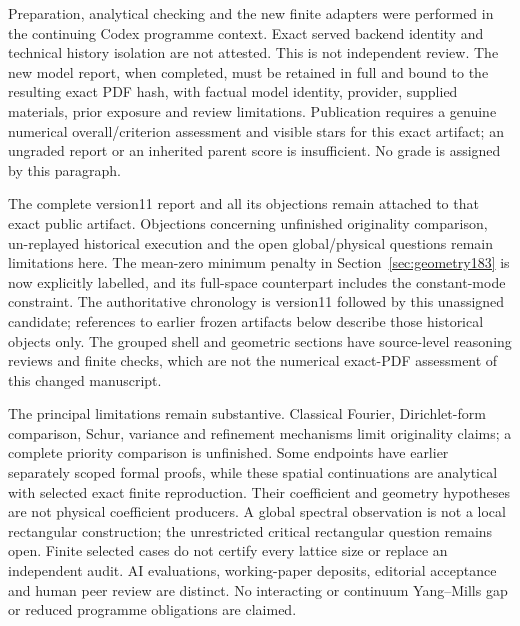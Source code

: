 \documentclass[11pt]{article}
\begin{document}
Preparation, analytical checking and the new finite adapters were performed
in the continuing Codex programme context. Exact served backend identity
and technical history isolation are not attested. This is not independent
review. The new model report, when completed, must be retained in full and
bound to the resulting exact PDF hash, with factual model identity,
provider, supplied materials, prior exposure and review limitations.
Publication requires a genuine numerical overall/criterion assessment and
visible stars for this exact artifact; an ungraded report or an inherited
parent score is insufficient. No grade is assigned by this paragraph.

The complete version11 report and all its objections remain attached to
that exact public artifact. Objections concerning unfinished originality
comparison, un-replayed historical execution and the open global/physical
questions remain limitations here. The mean-zero minimum penalty in
Section~\ref{sec:geometry183} is now explicitly labelled, and its full-space
counterpart includes the constant-mode constraint. The authoritative
chronology is version11 followed by this unassigned candidate; references
to earlier frozen artifacts below describe those historical objects only.
The grouped shell and geometric sections have source-level reasoning reviews and finite checks,
which are not the numerical exact-PDF assessment of this changed manuscript.

The principal limitations remain substantive. Classical Fourier,
Dirichlet-form comparison, Schur, variance and refinement mechanisms limit
originality claims; a complete priority comparison is unfinished. Some
endpoints have earlier separately scoped formal proofs, while these spatial
continuations are analytical with selected exact finite reproduction.
Their coefficient and geometry hypotheses are not physical coefficient
producers. A global spectral observation is not a local rectangular
construction; the unrestricted critical rectangular question remains open.
Finite selected cases do not certify every lattice size or replace an
independent audit. AI evaluations, working-paper deposits, editorial
acceptance and human peer review are distinct. No interacting or continuum
Yang--Mills gap or reduced programme obligations are claimed.
\end{document}
